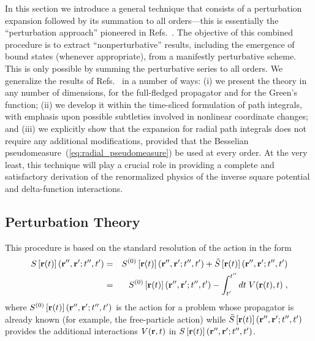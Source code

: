 \documentclass[a4paper,preprint,draft,showpacs,amsmath,amsfonts,amssymb,aps,prd]{revtex4}%
\begin{document}
In this section we introduce a general 
technique that consists of a perturbation 
expansion followed by its summation to all orders---this is
essentially the ``perturbation approach'' pioneered in Refs.~\cite{bha:89,bha:88}.
The objective of this combined procedure is to extract ``nonperturbative''
results, including the emergence of bound states (whenever appropriate), from
a manifestly perturbative scheme.
This is only possible by summing the perturbative series to all orders.
We generalize the results of Refs.~\cite{bha:89,bha:88}  in a number of ways:
(i) we present the theory in any number of dimensions,
 for the full-fledged propagator and for the Green's function;
(ii) we develop it within the time-sliced formulation of path integrals,
with emphasis upon possible subtleties involved in nonlinear
coordinate changes;
and (iii) we explicitly show that the expansion for radial path integrals 
does not require any additional modifications, provided that the Besselian
pseudomeasure~(\ref{eq:radial_pseudomeasure}) be used at every order.
At the very least,
this technique will play a crucial role
in providing a complete and satisfactory derivation of the
renormalized physics of the inverse square potential and delta-function interactions.


\subsection{Perturbation Theory}
\label{sec:perturbation_theory}

This procedure is based on the standard 
resolution of the action in the form
\begin{eqnarray}
S 
\left[ {\bf r}(t)  \right]  ({\bf r}'', {\bf r}' ; t'',t')  
& = &
S^{(0)}   
\left[ {\bf r}(t)  \right]  ({\bf r}'', {\bf r}' ; t'',t')  
+
\tilde{S}  
\left[ {\bf r}(t)  \right]  ({\bf r}'', {\bf r}' ; t'',t')  
\nonumber \\
& = &
S^{(0)}   
\left[ {\bf r}(t)  \right]  ({\bf r}'', {\bf r}' ; t'',t')  
-
\int_{t'}^{t''} 
dt \;
V({\bf r} (t),t)
\;  ,
\label{eq:Hamiltonian_perturb_split}
\end{eqnarray}
where
$
S^{(0)}  \left[ {\bf r}(t)  \right]  ({\bf r}'', {\bf r}' ; t'',t')  
$ 
is the action for a  problem whose
propagator is already known
(for example, the free-particle action) while
$
\tilde{S}  \left[ {\bf r}(t)  \right]  ({\bf r}'', {\bf r}' ; t'',t')  
$ 
provides the additional interactions 
$
V({\bf r},t )
$ 
in 
$
S  \left[ {\bf r}(t)  \right]  ({\bf r}'', {\bf r}' ; t'',t')  
$. 
\end{document}
